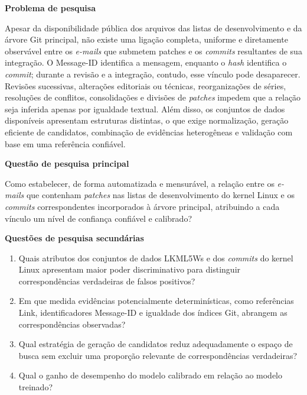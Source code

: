 \textbf{Problema de pesquisa}

Apesar da disponibilidade pública dos arquivos das listas de desenvolvimento e da árvore Git principal, não existe uma ligação completa, uniforme e diretamente observável entre os \textit{e-mails} que submetem patches e os \textit{commits} resultantes de sua integração. O Message-ID identifica a mensagem, enquanto o \textit{hash} identifica o \textit{commit}; durante a revisão e a integração, contudo, esse vínculo pode desaparecer. Revisões sucessivas, alterações editoriais ou técnicas, reorganizações de séries, resoluções de conflitos, consolidações e divisões de \textit{patches} impedem que a relação seja inferida apenas por igualdade textual. Além disso, os conjuntos de dados disponíveis apresentam estruturas distintas, o que exige normalização, geração eficiente de candidatos, combinação de evidências heterogêneas e validação com base em uma referência confiável.

\textbf{Questão de pesquisa principal}

Como estabelecer, de forma automatizada e mensurável, a relação entre os \textit{e-mails} que contenham \textit{patches} nas listas de desenvolvimento do kernel Linux e os \textit{commits} correspondentes incorporados à árvore principal, atribuindo a cada vínculo um nível de confiança confiável e calibrado?

\textbf{Questões de pesquisa secundárias}


\begin{enumerate}[label=\textbf{\arabic*.}]
	\item Quais atributos dos conjuntos de dados LKML5Ws e dos \textit{commits} do kernel Linux apresentam maior poder discriminativo para distinguir correspondências verdadeiras de falsos positivos?
	\item Em que medida evidências potencialmente determinísticas, como referências Link, identificadores Message-ID e igualdade dos índices Git, abrangem as correspondências observadas?
	\item Qual estratégia de geração de candidatos reduz adequadamente o espaço de busca sem excluir uma proporção relevante de correspondências verdadeiras?
	\item Qual o ganho de desempenho do modelo calibrado em relação ao modelo treinado?
\end{enumerate}
